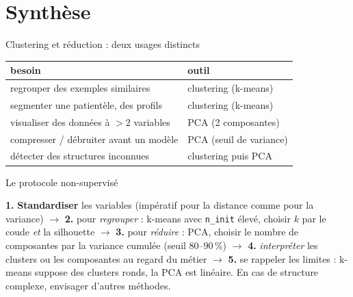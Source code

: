 \documentclass[aspectratio=169,11pt]{beamer}
\begin{document}
\section{Synthèse}

\begin{frame}{Clustering et réduction : deux usages distincts}
\begin{ucadret}
{\small \begin{center}\renewcommand{\arraystretch}{1.25}
\begin{tabular}{l|l}
\textbf{besoin} & \textbf{outil}\\\hline
regrouper des exemples similaires & clustering (k-means)\\
segmenter une patientèle, des profils & clustering (k-means)\\
visualiser des données à $>2$ variables & PCA (2 composantes)\\
compresser / débruiter avant un modèle & PCA (seuil de variance)\\
détecter des structures inconnues & clustering puis PCA\\
\end{tabular}\end{center}}
\end{ucadret}
\end{frame}

\begin{frame}{Le protocole non-supervisé}
\begin{ucadret}
{\small \textbf{1.} \textbf{Standardiser} les variables (impératif pour la distance comme pour la variance) $\to$ \textbf{2.} pour \emph{regrouper} : k-means avec \texttt{n\_init} élevé, choisir $k$ par le coude \emph{et} la silhouette $\to$ \textbf{3.} pour \emph{réduire} : PCA, choisir le nombre de composantes par la variance cumulée (seuil $80$–$90\,\%$) $\to$ \textbf{4.} \emph{interpréter} les clusters ou les composantes au regard du métier $\to$ \textbf{5.} se rappeler les limites : k-means suppose des clusters ronds, la PCA est linéaire. En cas de structure complexe, envisager d'autres méthodes.}
\end{ucadret}
\end{frame}
\end{document}
